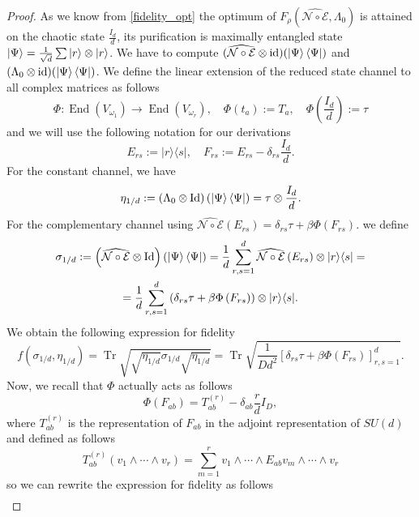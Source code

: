 \documentclass[10pt,twocolumn,superscriptaddress,aps,amsmath,amssymb,citeautoscript,floatfix,prx]{revtex4-2}
\theoremstyle{plain}
\theoremstyle{plain}
\theoremstyle{plain}
\theoremstyle{plain}
\theoremstyle{plain}
\theoremstyle{plain}
\theoremstyle{plain}
\theoremstyle{definition}
\theoremstyle{plain}
\begin{document}
\begin{appendix}
\begin{proof}
As we know from \ref{fidelity_opt} the optimum of $F_{\rho}(\widehat{\mathcal{N} \circ \mathcal{E}}, \Lambda_0)$ 
is attained on the chaotic state $\frac{I_d}{d}$, its purification is maximally entangled state $\ket{\Psi}=\frac{1}{\sqrt{d}}\sum |r\rangle \otimes|r\rangle $. 
We have to compute $(\widehat{\mathcal{N} \circ \mathcal{E}} \otimes \mathrm{id})(\ket{\Psi}\bra{\Psi})$ and $(\Lambda_0 \otimes \mathrm{id})(\ket{\Psi}\bra{\Psi})$.
We define the linear extension of the reduced state channel to all complex matrices as follows
$$
\Phi: \operatorname{End}\left(V_{\omega_1}\right) \rightarrow \operatorname{End}\left(V_{\omega_r}\right), \quad \Phi\left(t_a\right):=T_a, \quad \Phi\left(\frac{I_d}{d}\right):=\tau
$$
and we will use the following notation for our derivations
\begin{equation}\label{eq:matr_units}
     E_{r s}:=|r\rangle\langle s|, \quad F_{r s}:=E_{r s}-\delta_{r s} \frac{I_d}{d}.
\end{equation}
For the constant channel, we have
\[
     \eta_{1/d}:=(\Lambda_0 \otimes \mathrm{Id})\left(\ket{\Psi}\bra{\Psi}\right)=\tau \otimes \frac{I_d}{d}.
\]  
For the complementary channel using 
$
\widehat{\mathcal{N} \circ \mathcal{E}}\left(E_{r s}\right)=\delta_{r s} \tau+\beta \Phi\left(F_{r s}\right) .
$
we define 
\[
\begin{gathered}
     \sigma_{1/d}:=\left(\widehat{\mathcal{N} \circ \mathcal{E}} \otimes \mathrm{Id}\right)\left(\ket{\Psi}\bra{\Psi}\right)=
     \frac{1}{d}\sum_{r, s=1}^d \widehat{\mathcal{N} \circ \mathcal{E}}\left(E_{r s}\right) \otimes|r\rangle\langle s| =\\
     =\frac{1}{d}\sum_{r, s=1}^d \left(\delta_{r s} \tau+\beta \Phi\left(F_{r s}\right)\right) \otimes|r\rangle\langle s| .
\end{gathered}
\]
We obtain the following expression for fidelity
\[
     f\left(\sigma_{1/d}, \eta_{1/d}\right)=\operatorname{Tr}\sqrt{\sqrt{\eta_{1/d}} \sigma_{1/d} \sqrt{\eta_{1/d}}}=\operatorname{Tr} \sqrt{\frac{1}{Dd^2}\left[\delta_{r s} \tau+\beta \Phi\left(F_{r s}\right)\right]_{r, s=1}^d}.
\]
Now, we recall that $\Phi$ actually acts as follows
\[
        \Phi\left(F_{a b}\right)=T_{a b}^{(r)}-\delta_{a b} \frac{r}{d} I_D,
\]
where $T_{a b}^{(r)}$ is the representation of $F_{a b}$ in the adjoint representation of $SU(d)$ and defined as follows
\[
    T_{a b}^{(r)}\left(v_1 \wedge \cdots \wedge v_r\right)=\sum_{m=1}^r v_1 \wedge \cdots \wedge E_{a b} v_m \wedge \cdots \wedge v_r
\]
so we can rewrite the expression for fidelity as follows
\[
\begin{aligned}

\end{aligned}\]
\end{proof}
\end{appendix}
\end{document}
